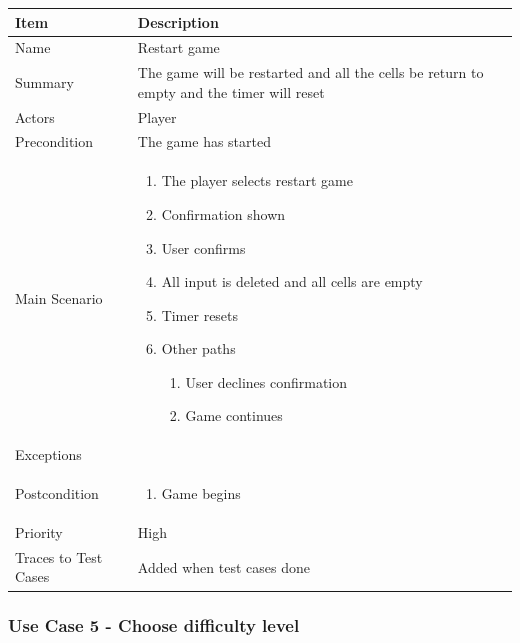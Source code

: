 \documentclass[12pt]{article}
\begin{document}
\begin{center}
\setlength{\tabcolsep}{18pt}
\renewcommand{\arraystretch}{1.3}
\begin{tabular}{ |p{3cm}|p{10cm}| }
    \hline
    \rowcolor{green}
   Item & Description \\
    \hline
    Name & Restart game \\
    \hline
    Summary & The game will be restarted and all the cells be return to empty and the timer will reset \\
    \hline
    Actors & Player \\
    \hline
    Precondition & The game has started \\
    \hline
    Main Scenario &     
    \vspace*{-0.2in}
    \begin{enumerate}
    \item The player selects restart game
    \item Confirmation shown
    \item User confirms
    \item All input is deleted and all cells are empty
    \item Timer resets
    \item Other paths
        \begin{enumerate}
            \item User declines confirmation
            \item Game continues
        \end{enumerate}
    \end{enumerate}  \\
    \hline
    Exceptions &  \\
    \hline
    Postcondition & 
    \vspace*{-0.2in}
    \begin{enumerate}
        \item Game begins
    \end{enumerate}  \\
    \hline
    Priority & High  \\
    \hline
    Traces to Test Cases & Added when test cases done  \\
    \hline
\end{tabular}
\end{center}

\newpage


\subsubsection{Use Case 5 - Choose difficulty level} \label{uc:5}
\end{document}
